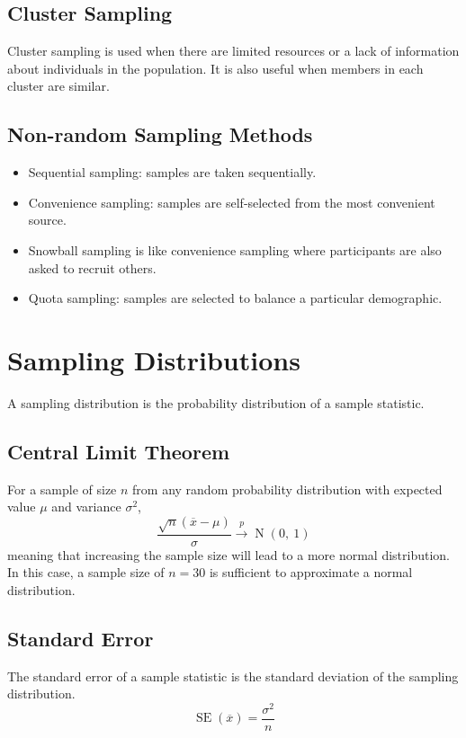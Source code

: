 \documentclass{article}
\begin{document}
\subsection{Cluster Sampling}
Cluster sampling is used when there are limited resources or a lack of
information about individuals in the population. It is also useful when
members in each cluster are similar.
\subsection{Non-random Sampling Methods}
\begin{itemize}
    \item Sequential sampling: samples are taken sequentially.
    \item Convenience sampling: samples are self-selected from the most
          convenient source.
    \item Snowball sampling is like convenience sampling where
          participants are also asked to recruit others.
    \item Quota sampling: samples are selected to balance a particular
          demographic.
\end{itemize}
\section{Sampling Distributions}
A sampling distribution is the probability distribution of a sample
statistic.
\subsection{Central Limit Theorem}
For a sample of size \(n\) from any random probability distribution
with expected value \(\mu\) and variance \(\sigma^2\),
\begin{equation*}
    \frac{\sqrt{n}\left( \overline{x} - \mu \right)}{\sigma} \overset{p}{\rightarrow} \operatorname{N}{\left( 0,\: 1 \right)}
\end{equation*}
meaning that increasing the sample size will lead to a more normal
distribution. In this case, a sample size of \(n = 30\) is sufficient to
approximate a normal distribution.
\subsection{Standard Error}
The standard error of a sample statistic is the standard deviation of
the sampling distribution.
\begin{equation*}
    \operatorname{SE}{\left( \overline{x} \right)} = \frac{\sigma^2}{n}
\end{equation*}
\end{document}
